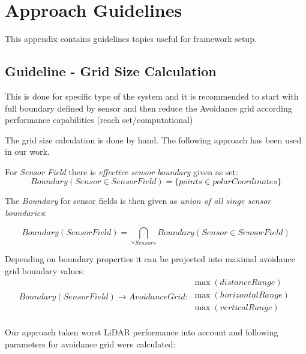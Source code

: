 \cleardoublepage

\chapter{Approach Guidelines}

\noindent This appendix contains guidelines topics useful for framework setup.

\section{Guideline - Grid Size Calculation}\label{app:gridSizeCalculation}
\begin{note}
	This is done for specific type of the system and it is recommended to start with full boundary defined by sensor and then reduce the Avoidance grid according performance capabilities (reach set/computational)
\end{note}

\noindent The grid size calculation is done by hand. The following approach has been used in our work. 

For \emph{Sensor Field} there is \emph{effective sensor boundary} given as set:
\begin{equation}
    Boundary(Sensor \in Sensor Field) = \{points \in polarCoordinates\}
\end{equation}

\noindent The \emph{Boundary} for sensor fields is then given as \emph{union of all singe sensor boundaries}:

\begin{equation}
     Boundary(Sensor Field) = \bigcap_{\forall Sensors} Boundary(Sensor \in Sensor Field)
\end{equation}

\noindent Depending on boundary properties it can be projected into maximal avoidance grid boundary values:
\begin{equation}
    Boundary(Sensor Field) \to Avoidance Grid : 
    \begin{gathered}
        \max(distanceRange)\\
        \max(horizontalRange)\\
        \max(verticalRange)\\
    \end{gathered}
\end{equation}

\noindent Our approach taken worst LiDAR performance into account \cite{sabatini2014lidar} and following parameters for avoidance grid were calculated:

